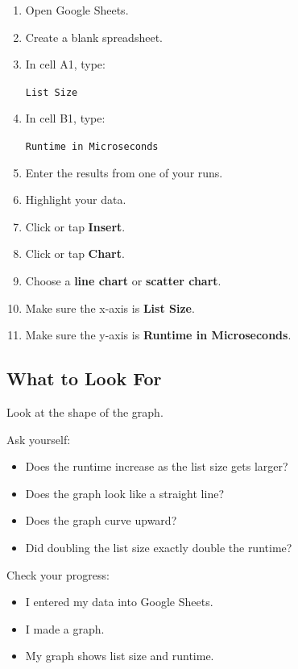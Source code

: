 \documentclass[11pt]{article}
\newcommand{\checkbox}{$\square$}
\begin{document}
\begin{enumerate}
    \item Open Google Sheets.
    \item Create a blank spreadsheet.
    \item In cell A1, type:

    \begin{center}
    \texttt{List Size}
    \end{center}

    \item In cell B1, type:

    \begin{center}
    \texttt{Runtime in Microseconds}
    \end{center}

    \item Enter the results from one of your runs.
    \item Highlight your data.
    \item Click or tap \textbf{Insert}.
    \item Click or tap \textbf{Chart}.
    \item Choose a \textbf{line chart} or \textbf{scatter chart}.
    \item Make sure the x-axis is \textbf{List Size}.
    \item Make sure the y-axis is \textbf{Runtime in Microseconds}.
\end{enumerate}

\subsection*{What to Look For}

Look at the shape of the graph.

Ask yourself:

\begin{itemize}
    \item Does the runtime increase as the list size gets larger?
    \item Does the graph look like a straight line?
    \item Does the graph curve upward?
    \item Did doubling the list size exactly double the runtime?
\end{itemize}

\noindent Check your progress:

\begin{itemize}
    \item[\checkbox] I entered my data into Google Sheets.
    \item[\checkbox] I made a graph.
    \item[\checkbox] My graph shows list size and runtime.
\end{itemize}
\end{document}

